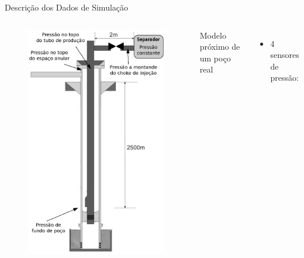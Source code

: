 \documentclass{beamer}
\begin{document}
\begin{frame}{Descrição dos Dados de Simulação}
    
    \begin{columns}[T]
        \begin{figure}[!htb]
            \centering
            \includegraphics[height=.8\textheight]{figuras/poco_simulado.ps}
        \end{figure}
        Modelo próximo de um poço real
        \begin{itemize}
            \item 4 sensores de pressão:

\end{itemize}
\end{columns}
\end{frame}
\end{document}
